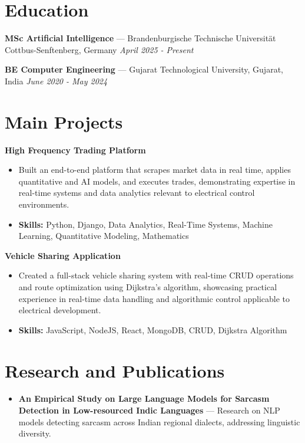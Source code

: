 \documentclass[a4paper,10pt]{article}
\begin{document}
\section*{Education}
\textbf{MSc Artificial Intelligence} — Brandenburgische Technische Universität Cottbus-Senftenberg, Germany \hfill \textit{April 2025 - Present}\par
\vspace{1.5pt}
\textbf{BE Computer Engineering} — Gujarat Technological University, Gujarat, India \hfill \textit{June 2020 - May 2024}\par

\section*{Main Projects}
\textbf{High Frequency Trading Platform}\par
\vspace{1pt}
\begin{itemize}
  \item Built an end-to-end platform that scrapes market data in real time, applies quantitative and AI models, and executes trades, demonstrating expertise in real-time systems and data analytics relevant to electrical control environments.
  \item \textbf{Skills:} Python, Django, Data Analytics, Real-Time Systems, Machine Learning, Quantitative Modeling, Mathematics
\end{itemize}
\vspace{3pt}
\textbf{Vehicle Sharing Application}\par
\vspace{1pt}
\begin{itemize}
  \item Created a full-stack vehicle sharing system with real-time CRUD operations and route optimization using Dijkstra's algorithm, showcasing practical experience in real-time data handling and algorithmic control applicable to electrical development.
  \item \textbf{Skills:} JavaScript, NodeJS, React, MongoDB, CRUD, Dijkstra Algorithm
\end{itemize}

\section*{Research and Publications}
\begin{itemize}
\item \textbf{An Empirical Study on Large Language Models for Sarcasm Detection in Low-resourced Indic Languages} — Research on NLP models detecting sarcasm across Indian regional dialects, addressing linguistic diversity.
\end{itemize}
\end{document}
